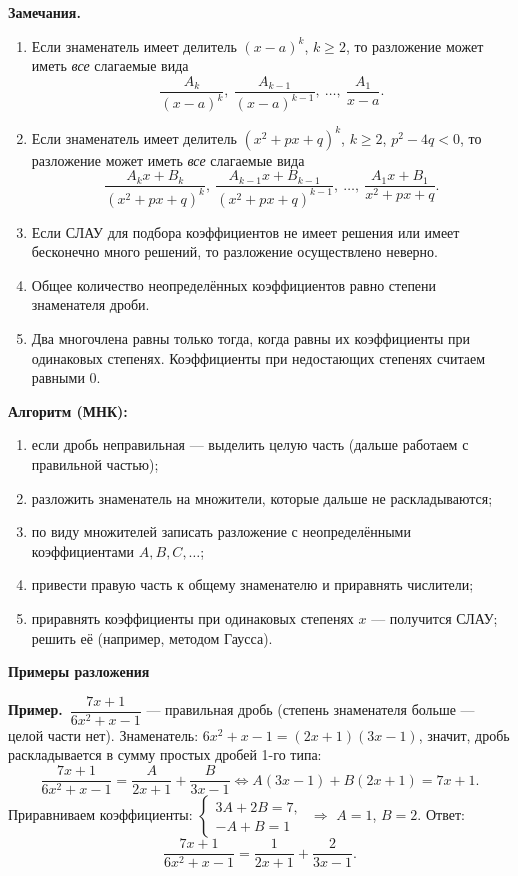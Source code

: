 \documentclass[a4paper,11pt]{article}
\newcommand{\prim}{\par\smallskip\noindent\textbf{\textcolor{teoc!80!black}{Пример.}}\ }
\newcommand{\podr}[1]{\par\needspace{8\baselineskip}\medskip
  {\large\bfseries\textcolor{oprc!80!black}{#1}}\par\nopagebreak\smallskip}
\begin{document}
\textbf{Замечания.}
\begin{enumerate}[leftmargin=*]
  \item Если знаменатель имеет делитель $(x - a)^k$, $k \ge 2$, то разложение может иметь \emph{все} слагаемые вида
        \[ \frac{A_k}{(x - a)^k},\ \frac{A_{k-1}}{(x - a)^{k-1}},\ \dots,\ \frac{A_1}{x - a}. \]
  \item Если знаменатель имеет делитель $(x^2 + px + q)^k$, $k \ge 2$, $p^2 - 4q < 0$, то разложение может иметь \emph{все} слагаемые вида
        \[ \frac{A_k x + B_k}{(x^2 + px + q)^k},\ \frac{A_{k-1} x + B_{k-1}}{(x^2 + px + q)^{k-1}},\ \dots,\ \frac{A_1 x + B_1}{x^2 + px + q}. \]
  \item Если СЛАУ для подбора коэффициентов не имеет решения или имеет бесконечно много решений, то разложение
        осуществлено неверно.
  \item Общее количество неопределённых коэффициентов равно степени знаменателя дроби.
  \item Два многочлена равны только тогда, когда равны их коэффициенты при одинаковых степенях.
        Коэффициенты при недостающих степенях считаем равными $0$.
\end{enumerate}

\textbf{Алгоритм (МНК):}
\begin{enumerate}[leftmargin=*]
  \item если дробь неправильная --- выделить целую часть (дальше работаем с правильной частью);
  \item разложить знаменатель на множители, которые дальше не раскладываются;
  \item по виду множителей записать разложение с неопределёнными коэффициентами $A, B, C, \dots$;
  \item привести правую часть к общему знаменателю и приравнять числители;
  \item приравнять коэффициенты при одинаковых степенях $x$ --- получится СЛАУ; решить её (например, методом Гаусса).
\end{enumerate}

\podr{Примеры разложения}

\prim $\dfrac{7x + 1}{6x^2 + x - 1}$ --- правильная дробь (степень знаменателя больше --- целой части нет).
Знаменатель: $6x^2 + x - 1 = (2x + 1)(3x - 1)$, значит, дробь раскладывается в сумму простых дробей 1-го типа:
\[
  \frac{7x + 1}{6x^2 + x - 1} = \frac{A}{2x + 1} + \frac{B}{3x - 1} \iff A(3x - 1) + B(2x + 1) = 7x + 1.
\]
Приравниваем коэффициенты: $\begin{cases} 3A + 2B = 7, \\ -A + B = 1 \end{cases}$ $\Rightarrow$ $A = 1$, $B = 2$. Ответ:
\[
  \frac{7x + 1}{6x^2 + x - 1} = \frac{1}{2x + 1} + \frac{2}{3x - 1}.
\]
\end{document}
